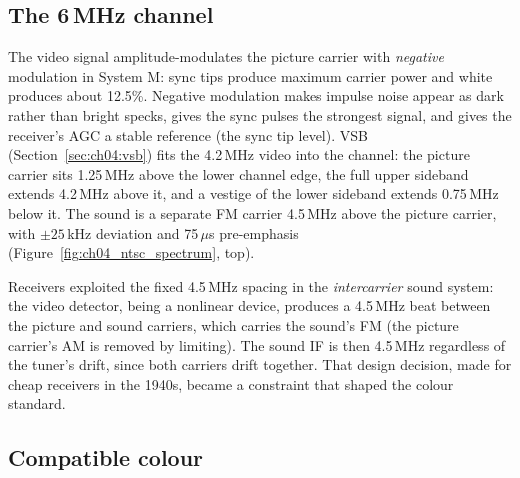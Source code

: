 
\subsection{The 6\,MHz channel}

The video signal amplitude-modulates the picture carrier with \emph{negative} modulation in System M: sync
tips produce maximum carrier power and white produces about 12.5\%. Negative modulation makes impulse noise
appear as dark rather than bright specks, gives the sync pulses the strongest signal, and gives the
receiver's AGC a stable reference (the sync tip level). VSB (Section~\ref{sec:ch04:vsb}) fits the 4.2\,MHz
video into the channel: the picture carrier sits 1.25\,MHz above the lower channel edge, the full upper
sideband extends 4.2\,MHz above it, and a vestige of the lower sideband extends 0.75\,MHz below it. The sound
is a separate FM carrier 4.5\,MHz above the picture carrier, with $\pm25$\,kHz deviation and 75\,$\mu$s
pre-emphasis (Figure~\ref{fig:ch04_ntsc_spectrum}, top).

Receivers exploited the fixed 4.5\,MHz spacing in the \emph{intercarrier} sound system: the video detector,
being a nonlinear device, produces a 4.5\,MHz beat between the picture and sound carriers, which carries the
sound's FM (the picture carrier's AM is removed by limiting). The sound IF is then 4.5\,MHz regardless of the
tuner's drift, since both carriers drift together. That design decision, made for cheap receivers in the
1940s, became a constraint that shaped the colour standard.


\subsection{Compatible colour}

